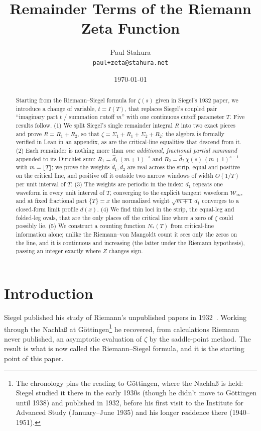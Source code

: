 \documentclass[11pt]{article}
\title{\textbf{Remainder Terms of the Riemann Zeta Function}}
\author{Paul Stahura\\[0.3em]\small\texttt{paul+zeta@stahura.net}}
\date{\today}
\theoremstyle{definition}
\begin{document}
\maketitle

\begin{abstract}
Starting from the Riemann--Siegel formula for $\zeta(s)$ given in Siegel's
1932 paper, we introduce a change of variable, $t=I(T)$, that replaces
Siegel's coupled pair ``imaginary part $t$ / summation cutoff $m$'' with one
continuous cutoff parameter $T$. Five results follow. (1) We split Siegel's
single remainder
integral $R$ into two exact pieces and prove $R=R_{1}+R_{2}$, so that
$\zeta=\Sigma_{1}+R_{1}+\Sigma_{2}+R_{2}$; the algebra is formally verified
in Lean in an appendix, as are the critical-line equalities that descend
from it. (2) Each remainder is nothing more than \emph{one additional,
fractional partial summand} appended to its Dirichlet sum:
$R_{1}=\hat d_1\,(m+1)^{-s}$ and $R_{2}=\hat d_2\,\chi(s)\,(m+1)^{s-1}$
with $m=\lfloor T\rfloor$; we prove the weights $\hat d_1,\hat d_2$ are
real across the strip, equal and positive on the critical line, and
positive off it outside two narrow windows of width $O(1/T)$ per unit
interval of $T$. (3) The weights are periodic in
the index: $d_1$ repeats one waveform in every unit interval of $T$,
converging to the explicit tangent waveform $\mathcal W_{\infty}$, and at
fixed fractional part $\{T\}=x$ the normalized weight $\sqrt{m+1}\,d_1$
converges to a closed-form limit profile $d(x)$.
(4) We find thin loci in the strip, the equal-leg and
folded-leg ovals, that are the only places off the critical line where a
zero of $\zeta$ could possibly lie. (5) We construct a counting function
$N_{\ast}(T)$ from critical-line information alone; unlike the Riemann--von
Mangoldt count it sees only the zeros on the line, and it is continuous
and increasing (the latter under the Riemann hypothesis), passing an
integer exactly where $Z$ changes sign.
\end{abstract}

\tableofcontents

\section{Introduction}

Siegel published his study of Riemann's unpublished papers in
1932~\cite{Siegel1932}. Working through the Nachla\ss{} at
G\"ottingen\footnote{The chronology pins the reading to G\"ottingen,
where the Nachla\ss{} is held: Siegel studied it there in the early
1930s (though he didn't move to G\"ottingen until 1938) and published
in 1932, before his first visit to the Institute for Advanced Study
(January--June 1935) and his longer residence there (1940--1951).} he
recovered, from calculations Riemann never published, an asymptotic
evaluation of $\zeta$ by the saddle-point method. The result is what is
now called the Riemann--Siegel formula, and it is the starting point of
this paper.
\end{document}
